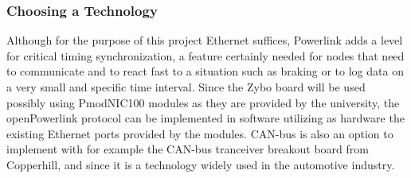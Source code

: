 \subsubsection{Choosing a Technology}
Although for the purpose of this project Ethernet suffices, Powerlink adds a level for critical timing synchronization, a feature certainly needed for nodes that need to communicate and to react fast to a situation such as braking or to log data on a very small and specific time interval. Since the Zybo board will be used possibly using PmodNIC100 modules as they are provided by the university, the openPowerlink protocol can be implemented in software utilizing as hardware the existing Ethernet ports provided by the modules. CAN-bus is also an option to implement with for example the CAN-bus tranceiver breakout board from Copperhill, and since it is a technology widely used in the automotive industry.


